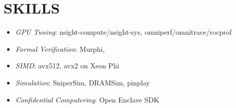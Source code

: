 \section{SKILLS}

    \vspace{-7pt}
    \resumeItemListStart
            \begin{itemize}
            \item[] \textit{GPU Tuning}: nsight-compute/nsight-sys, omniperf/omnitrace/rocprof
            \item[] \textit{Formal Verification}: Murphi, 
            \item[] \textit{SIMD}: avx512, avx2 on Xeon Phi
            \item[] \textit{Simulation}: SniperSim, DRAMSim, pinplay
            \item[] \textit{Confidential Computering}: Open Enclave SDK
            \end{itemize}

    \resumeItemListEnd